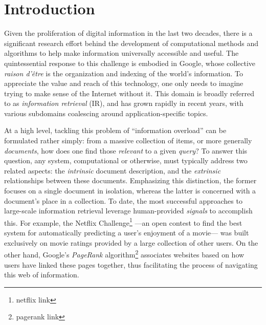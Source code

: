 

\graphicspath{{1/figures/}}

\chapter{Introduction}
\label{chp:introduction}

Given the proliferation of digital information in the last two decades, there is a significant research effort behind the development of computational methods and algorithms to help make information universally accessible and useful. %
The quintessential response to this challenge is embodied in Google, whose collective \emph{raison d'\^etre} is the organization and indexing of the world's information.
To appreciate the value and reach of this technology, one only needs to imagine trying to make sense of the Internet without it.
This domain is broadly referred to as \emph{information retrieval} (IR), and has grown rapidly in recent years, with various subdomains coalescing around application-specific topics.

At a high level, tackling this problem of ``information overload'' can be formulated rather simply: from a massive collection of items, or more generally \emph{documents}, how does one find those \emph{relevant} to a given \emph{query}?
To answer this question, any system, computational or otherwise, must typically address two related aspects: the \emph{intrinsic} document description, and the \emph{extrinsic} relationships between these documents.
Emphasizing this distinction, the former focuses on a single document in isolation, whereas the latter is concerned with a document's place in a collection.
To date, the most successful approaches to large-scale information retrieval leverage human-provided \emph{signals} to accomplish this.
For example, the Netflix Challenge\footnote{netflix link} ---an open contest to find the best system for automatically predicting a user's enjoyment of a movie--- was built exclusively on movie ratings provided by a large collection of other users.
On the other hand, Google's \emph{PageRank} algorithm\footnote{pagerank link} associates websites based on how users have linked these pages together, thus facilitating the process of navigating this web of information.

